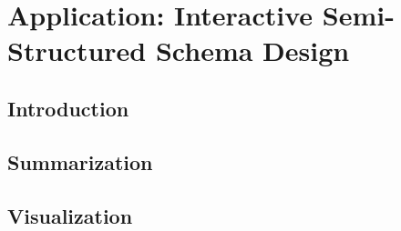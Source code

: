\chapter{Application: Interactive Semi-Structured Schema Design}
\section{Introduction}
\label{sec:introduction}


\section{Summarization}
\label{sec:distribution}


\section{Visualization}
\label{sec:visualization}


% 

% 

%

%
